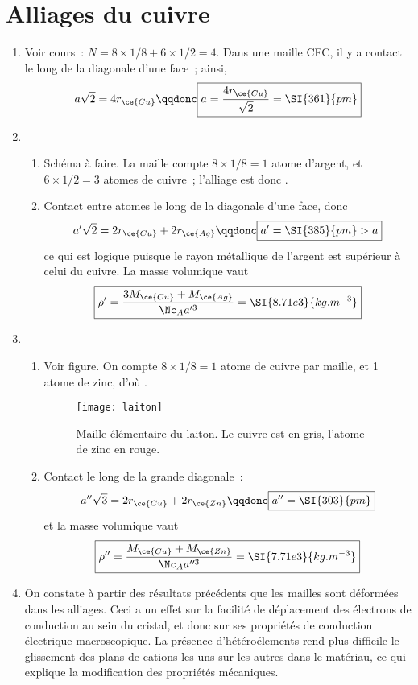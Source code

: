 \documentclass[a4paper, 12pt, final, garamond]{book}
\begin{document}
\section{Alliages du cuivre}
\begin{enumerate}
  \item Voir cours~: $N = 8\times1/8 + 6\times1/2 = 4$. Dans une maille CFC, il
    y a contact le long de la diagonale d'une face~; ainsi,
    \[
      a \sqrt{2} = 4r_{\ce{Cu}}
      \qqdonc
      \boxed{a = \frac{4r_{\ce{Cu}}}{\sqrt{2}} = \SI{361}{pm}}
    \]
  \item 
    \begin{enumerate}
      \item Schéma à faire. La maille compte $8\times1/8 = 1$ atome d'argent, et
        $6\times1/2 = 3$ atomes de cuivre~; l'alliage est donc .
      \item Contact entre atomes le long de la diagonale d'une face, donc
        \[
          a' \sqrt{2} = 2r_{\ce{Cu}} + 2r_{\ce{Ag}}
          \qqdonc
          \boxed{a' = \SI{385}{pm} > a}
        \]
        ce qui est logique puisque le rayon métallique de l'argent est supérieur
        à celui du cuivre. La masse volumique vaut
        \[
          \boxed{\rho' = \frac{3M_{\ce{Cu}} + M_{\ce{Ag}}}{\Nc_A a'^{3}} =
          \SI{8.71e3}{kg.m^{-3}}}
        \]
    \end{enumerate}
  \item 
    \begin{enumerate}
      \item Voir figure. On compte $8\times1/8 = 1$ atome de cuivre par maille,
        et 1 atome de zinc, d'où .
        \begin{figure}[h]
          \centering
          \texttt{[image: laiton]}
          \caption{Maille élémentaire du laiton. Le cuivre est en gris, l'atome
          de zinc en rouge.}
          \label{fig:laiton}
        \end{figure}
      \item Contact le long de la grande diagonale~:
        \[
          a'' \sqrt{3} = 2r_{\ce{Cu}} + 2r_{\ce{Zn}}
          \qqdonc
          \boxed{a'' = \SI{303}{pm}}
        \]
        et la masse volumique vaut
        \[
          \boxed{\rho'' = \frac{M_{\ce{Cu}} + M_{\ce{Zn}}}{\Nc_Aa''^{3}} = \SI{7.71e3}{kg.m ^{-3}}}
        \]
    \end{enumerate}
  \item On constate à partir des résultats précédents que les mailles sont
    déformées dans les alliages. Ceci a un effet sur la facilité de
    déplacement des électrons de conduction au sein du cristal, et donc sur ses
    propriétés de conduction électrique macroscopique. La présence
    d'hétéroélements rend plus difficile le glissement des plans de cations les
    uns sur les autres dans le matériau, ce qui explique la modification des
    propriétés mécaniques.
    
\end{enumerate}
\end{document}
